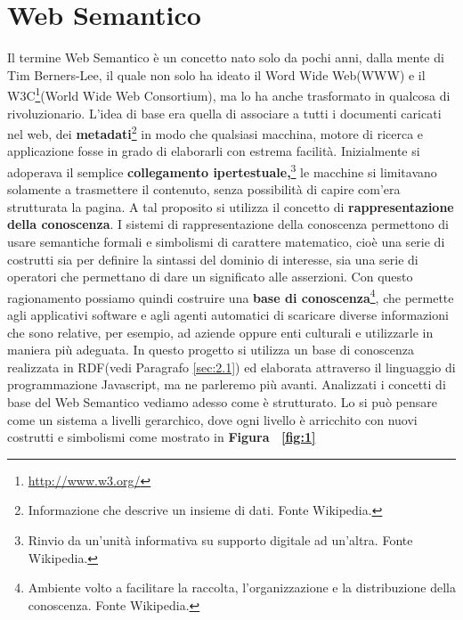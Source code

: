 \documentclass[a4paper,11pt]{article}
\begin{document}
\section{Web Semantico}
\label{sec:2}
Il termine Web Semantico è un concetto nato solo da pochi anni, dalla mente di Tim Berners-Lee, il quale non solo ha ideato il Word Wide Web(WWW) e il W3C\footnote{\url{http://www.w3.org/}}(World Wide Web Consortium), ma lo ha anche trasformato in qualcosa di rivoluzionario. L'idea di base era quella di associare a tutti i documenti caricati nel web, dei \textbf{metadati}\footnote{Informazione che descrive un insieme di dati. Fonte Wikipedia.} in modo che qualsiasi macchina, motore di ricerca e applicazione fosse in grado di elaborarli con estrema facilità.\newline
Inizialmente si adoperava il semplice \textbf{collegamento ipertestuale,}\footnote{Rinvio da un'unità informativa su supporto digitale ad un'altra. Fonte Wikipedia.} le macchine si limitavano solamente a trasmettere il contenuto, senza possibilità di capire com'era strutturata la pagina.
A tal proposito si utilizza il concetto di \textbf{rappresentazione della conoscenza}.
I sistemi di rappresentazione della conoscenza permettono di usare semantiche formali e simbolismi di carattere matematico, cioè una serie di costrutti sia per definire la sintassi del dominio di interesse, sia una serie di operatori che permettano di dare un significato alle asserzioni.
Con questo ragionamento possiamo quindi costruire una \textbf{base di conoscenza}\footnote{Ambiente volto a facilitare la raccolta, l'organizzazione e la distribuzione della conoscenza. Fonte Wikipedia.}, che permette agli applicativi software e agli agenti automatici di scaricare diverse informazioni che sono relative, per esempio, ad aziende oppure enti culturali e utilizzarle in maniera più adeguata. In questo progetto si utilizza un base di conoscenza realizzata in RDF(vedi Paragrafo \ref{sec:2.1}) ed elaborata attraverso il linguaggio di programmazione Javascript, ma ne parleremo più avanti.\newline
Analizzati i concetti di base del Web Semantico vediamo adesso come è strutturato. Lo si può pensare come un sistema a livelli gerarchico, dove ogni livello è arricchito con nuovi costrutti e simbolismi come mostrato in \textbf{Figura ~\ref{fig:1}}
\end{document}
